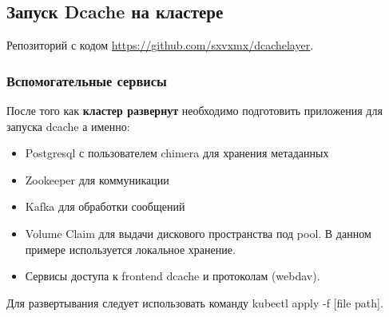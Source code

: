 \documentclass{article}
\begin{document}
\subsection{Запуск Dcache на кластере}
Репозиторий с кодом \url{https://github.com/sxvxmx/dcachelayer}.
\subsubsection{Вспомогательные сервисы}
После того как \textbf{кластер развернут} необходимо подготовить приложения для запуска dcache а именно:
\begin{itemize}
   \item Postgresql с пользователем chimera для хранения метаданных
   \item Zookeeper для коммуникации
   \item Kafka для обработки сообщений
   \item Volume Claim для выдачи дискового пространства под pool. В данном примере используется локальное хранение.
   \item Сервисы доступа к frontend dcache и протоколам (webdav). 
\end{itemize}
Для развертывания следует использовать команду {\selectfont kubectl apply -f [file path]}.
\end{document}
